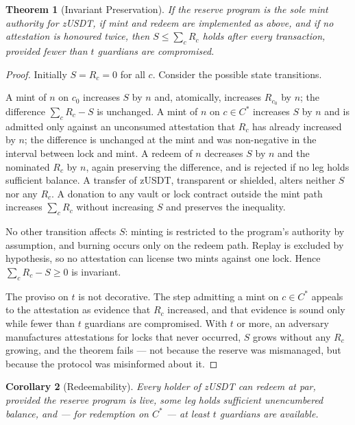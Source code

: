 \documentclass[11pt,a4paper]{article}
\newtheorem{theorem}{Theorem}[section]
\newtheorem{corollary}[theorem]{Corollary}
\begin{document}
\begin{theorem}[Invariant Preservation]
\label{thm:invariant}
If the reserve program is the sole mint authority for zUSDT, if mint and redeem are implemented as above, and if no attestation is honoured twice, then $S \leq \sum_{c} R_c$ holds after every transaction, provided fewer than $t$ guardians are compromised.
\end{theorem}

\begin{proof}
Initially $S = R_c = 0$ for all $c$. Consider the possible state transitions.

A mint of $n$ on $c_0$ increases $S$ by $n$ and, atomically, increases $R_{c_0}$ by $n$; the difference $\sum_c R_c - S$ is unchanged. A mint of $n$ on $c \in C^{*}$ increases $S$ by $n$ and is admitted only against an unconsumed attestation that $R_c$ has already increased by $n$; the difference is unchanged at the mint and was non-negative in the interval between lock and mint. A redeem of $n$ decreases $S$ by $n$ and the nominated $R_c$ by $n$, again preserving the difference, and is rejected if no leg holds sufficient balance. A transfer of zUSDT, transparent or shielded, alters neither $S$ nor any $R_c$. A donation to any vault or lock contract outside the mint path increases $\sum_c R_c$ without increasing $S$ and preserves the inequality.

No other transition affects $S$: minting is restricted to the program's authority by assumption, and burning occurs only on the redeem path. Replay is excluded by hypothesis, so no attestation can license two mints against one lock. Hence $\sum_c R_c - S \geq 0$ is invariant.

The proviso on $t$ is not decorative. The step admitting a mint on $c \in C^{*}$ appeals to the attestation as evidence that $R_c$ increased, and that evidence is sound only while fewer than $t$ guardians are compromised. With $t$ or more, an adversary manufactures attestations for locks that never occurred, $S$ grows without any $R_c$ growing, and the theorem fails --- not because the reserve was mismanaged, but because the protocol was misinformed about it.
\end{proof}

\begin{corollary}[Redeemability]
Every holder of zUSDT can redeem at par, provided the reserve program is live, some leg holds sufficient unencumbered balance, and --- for redemption on $C^{*}$ --- at least $t$ guardians are available.
\end{corollary}
\end{document}
